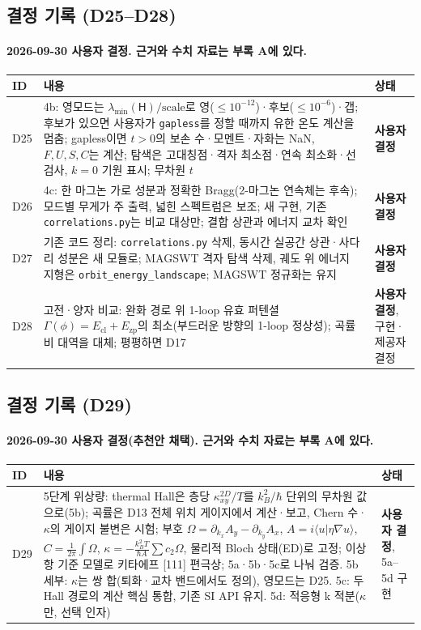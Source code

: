 \subsection{결정 기록 (D25--D28)}\label{decisions-stage4}
\begingroup%
  \framesubtitle{2026-09-30 사용자 결정. 근거와 수치 자료는 부록 A에 있다.}
  \small\renewcommand{\arraystretch}{1.12}
  \begin{tabularx}{\textwidth}{@{}p{0.7cm}YP{2.5cm}@{}}
    \toprule
    ID & 내용 & 상태 \\
    \midrule
    D25 & 4b: 영모드는 $\lambda_{\min}(\mathsf H)/\text{scale}$로 영($\le10^{-12}$)·후보($\le10^{-6}$)·갭; 후보가 있으면 사용자가 \texttt{gapless}를 정할 때까지 유한 온도 계산을 멈춤; gapless이면 $t>0$의 보손 수·모멘트·자화는 NaN, $F,U,S,C$는 계산; 탐색은 고대칭점·격자 최소점·연속 최소화·선 검사, $k=0$ 기원 표시; 무차원 $t$ & \textbf{사용자 결정} \\
    D26 & 4c: 한 마그논 가로 성분과 정확한 Bragg(2-마그논 연속체는 후속); 모드별 무게가 주 출력, 넓힌 스펙트럼은 보조; 새 구현, 기존 \texttt{correlations.py}는 비교 대상만; 결합 상관과 에너지 교차 확인 & \textbf{사용자 결정} \\
    D27 & 기존 코드 정리: \texttt{correlations.py} 삭제, 동시간 실공간 상관·사다리 성분은 새 모듈로; MAGSWT 격자 탐색 삭제, 궤도 위 에너지 지형은 \texttt{orbit\_energy\_landscape}; MAGSWT 정규화는 유지 & \textbf{사용자 결정} \\
    D28 & 고전·양자 비교: 완화 경로 위 1-loop 유효 퍼텐셜 $\Gamma(\phi)=E_{\mathrm{cl}}+E_{\mathrm{zp}}$의 최소(부드러운 방향의 1-loop 정상성); 곡률 비 대역을 대체; 평평하면 D17 & \textbf{사용자 결정}, 구현·제공자 결정 \\
    \bottomrule
  \end{tabularx}
\endgroup


\subsection{결정 기록 (D29)}\label{decisions-stage5}
\begingroup%
  \framesubtitle{2026-09-30 사용자 결정(추천안 채택). 근거와 수치 자료는 부록 A에 있다.}
  \small\renewcommand{\arraystretch}{1.12}
  \begin{tabularx}{\textwidth}{@{}p{0.7cm}YP{2.5cm}@{}}
    \toprule
    ID & 내용 & 상태 \\
    \midrule
    D29 & 5단계 위상량: thermal Hall은 층당 $\kappa_{xy}^{2D}/T$를 $k_B^2/\hbar$ 단위의 무차원 값으로(5b); 곡률은 D13 전체 위치 게이지에서 계산·보고, Chern 수·$\kappa$의 게이지 불변은 시험; 부호 $\Omega=\partial_{k_x}A_y-\partial_{k_y}A_x$, $A=i\langle u|\eta\nabla u\rangle$, $C=\frac{1}{2\pi}\int\Omega$, $\kappa=-\frac{k_B^2T}{\hbar A}\sum c_2\Omega$, 물리적 Bloch 상태(ED)로 고정; 이상항 기준 모델로 키타에프 [111] 편극상; 5a·5b·5c로 나눠 검증. 5b 세부: $\kappa$는 쌍 합(퇴화·교차 밴드에서도 정의), 영모드는 D25. 5c: 두 Hall 경로의 계산 핵심 통합, 기존 SI API 유지. 5d: 적응형 k 적분($\kappa$만, 선택 인자) & \textbf{사용자 결정}, 5a--5d 구현 \\
    \bottomrule
  \end{tabularx}
\endgroup


